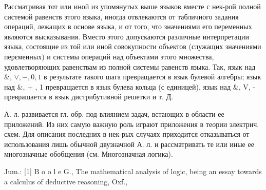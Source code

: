 \documentclass[10pt]{article}
\begin{document}
Рассматривая тот или иной из упомянутых выше языков вместе с нек-рой полной системой равенств этого языка, иногда отвлекаются от табличного задания операций, лежащих в основе языка, и от того, что значениями его переменных являются высказывания. Вместо этого допускаются различные интерпретации языка, состоящие из той или иной совокупности объектов (служащих значениями перєменных) и системы операций над объектами этого множества, удовлетворяющих равенствам из полной системы равенств языка. Так, язык над \&, $\vee,-, 0,1$ в результате такого шага превращается в язык булевой алгебры; язык над \&, + , 1 превращается в язык булева кольца (с единицей), язык над \&, V, - превращается в язык дистрибутивной решетки и т. Д.



А. л. развивается гл. обр. под влиянием задач, встающих в области ее приложений. Из них самую важную роль играют приложения в теории электрич. схем. Для описания последних в нек-рых случаях приходится отказываться от использования лишь обычной двузначной А. л. и рассматривать те или иные ее многозначные обобщения (см. Многозначная логика).



Jum.: [1] B o o l e G., The mathematical analysis of logic, being an essay towards a calculus of deductive reasoning, Oxf.,
\end{document}
